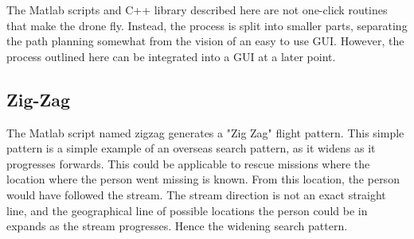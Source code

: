 The Matlab scripts and C++ library described here are not one-click routines that make the drone fly.
Instead, the process is split into smaller parts, separating the path planning somewhat from the vision of an easy to use GUI.
However, the process outlined here can be integrated into a GUI at a later point.

\subsection{Zig-Zag}
The Matlab script named zigzag generates a "Zig Zag" flight pattern.
This simple pattern is a simple example of an overseas search pattern, as it widens as it progresses forwards.
This could be applicable to rescue missions where the location where the person went missing is known.
From this location, the person would have followed the stream.
The stream direction is not an exact straight line, and the geographical line of possible locations
the person could be in expands as the stream progresses. Hence the widening search pattern.

